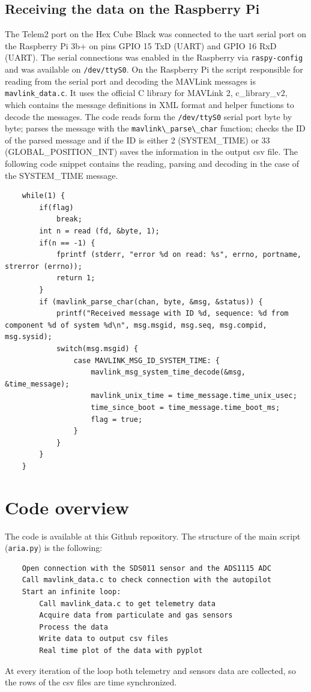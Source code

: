 \subsection{Receiving the data on the Raspberry Pi}
The Telem2 port on the Hex Cube Black was connected to the \gls{uart} serial port on the Raspberry Pi 3b+ on pins GPIO 15 TxD (UART) and GPIO 16 RxD (UART). The serial connections was enabled in the Raspberry via \verb|raspy-config| and was available on \verb|/dev/ttyS0|.
On the Raspberry Pi the script responsible for reading from the serial port and decoding the MAVLink messages is \verb|mavlink_data.c|. It uses the official C library for MAVLink 2, c\_library\_v2, which contains the message definitions in XML format and helper functions to decode the messages.
The code reads form the \verb|/dev/ttyS0| serial port byte by byte; parses the message with the \verb|mavlink\_parse\_char| function; checks the ID of the parsed message and if the ID is either 2 (SYSTEM\_TIME) or 33 (GLOBAL\_POSITION\_INT) saves the information in the output csv file. The following code snippet contains the reading, parsing and decoding in the case of the SYSTEM\_TIME message.
\begin{verbatim}
    while(1) {
        if(flag)
            break;
        int n = read (fd, &byte, 1);
        if(n == -1) {
            fprintf (stderr, "error %d on read: %s", errno, portname, strerror (errno));
            return 1;
        }
        if (mavlink_parse_char(chan, byte, &msg, &status)) {
            printf("Received message with ID %d, sequence: %d from component %d of system %d\n", msg.msgid, msg.seq, msg.compid, msg.sysid);
            switch(msg.msgid) {
                case MAVLINK_MSG_ID_SYSTEM_TIME: {
                    mavlink_msg_system_time_decode(&msg, &time_message);
                    mavlink_unix_time = time_message.time_unix_usec;
                    time_since_boot = time_message.time_boot_ms;
                    flag = true;
                }   
            }
        }
    }
\end{verbatim}
\section{Code overview}
The code is available at this Github repository\cite{repo}.
The structure of the main script (\verb|aria.py|) is the following:
\begin{verbatim}
    Open connection with the SDS011 sensor and the ADS1115 ADC
    Call mavlink_data.c to check connection with the autopilot
    Start an infinite loop:
        Call mavlink_data.c to get telemetry data
        Acquire data from particulate and gas sensors
        Process the data
        Write data to output csv files
        Real time plot of the data with pyplot
\end{verbatim}
At every iteration of the loop both telemetry and sensors data are collected, so the rows of the csv files are time synchronized.